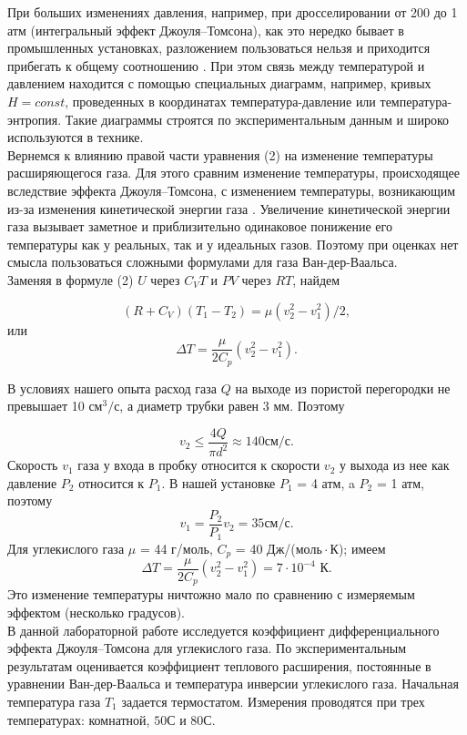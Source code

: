 \documentclass[a4paper, 12pt]{article}%
\begin{document}
	При больших изменениях давления, например, при дросселировании от 200 до 1 атм (интегральный эффект Джоуля–Томсона), как это нередко бывает в промышленных установках, разложением  пользоваться нельзя и приходится прибегать к общему соотношению . При этом связь между температурой и давлением находится с помощью специальных диаграмм, например, кривых $H = const$, проведенных в координатах температура-давление или температура-энтропия. Такие диаграммы строятся по экспериментальным данным и широко используются в технике.\\
	
	Вернемся к влиянию правой части уравнения (2) на изменение температуры расширяющегося газа. Для этого сравним изменение температуры, происходящее вследствие эффекта Джоуля–Томсона, с
	изменением температуры, возникающим из-за изменения кинетической энергии газа . Увеличение кинетической энергии газа вызывает заметное и приблизительно одинаковое понижение его температуры как у реальных, так и у идеальных газов. Поэтому при оценках нет смысла пользоваться сложными формулами для газа Ван-дер-Ваальса.\\
	
	Заменяя в формуле (2) $U$ через $C_V T$ и $P V$ через $RT$, найдем
	
	\begin{equation}
		(R+C_V)(T_1 - T_2) = \mu(v_2^2 - v_1^2)/2,
	\end{equation}
	или
	\begin{equation}
		\Delta T = \dfrac{\mu}{2C_p} (v_2^2 - v_1^2).
	\end{equation}
	
	В условиях нашего опыта расход газа $Q$ на выходе из пористой перегородки не превышает 10 $см^3/с$, а диаметр трубки равен 3 мм. Поэтому
	
	\begin{equation}
		v_2 \leqslant \dfrac{4Q}{\pi d^2} \approx 140 \text{см/с}.
	\end{equation}
	Скорость $v_1$ газа у входа в пробку относится к скорости $v_2$ у выхода из нее как давление $P_2$ относится к $P_1$. В нашей установке $P_1$ = 4 атм, a $P_2$ = 1 атм, поэтому
	\begin{equation}
		v_1 = \dfrac{P_2}{P_1} v_2 = 35 \text{см/с}.
	\end{equation}
	Для углекислого газа $\mu$ = 44 г/моль, $C_p$ = 40 Дж/($моль \cdot К$); имеем
	\begin{equation}
		\Delta T = \dfrac{\mu}{2C_p} (v_2^2 - v_1^2) = 7 \cdot 10^{-4}\text{ К}.
	\end{equation}
	Это изменение температуры ничтожно мало по сравнению с измеряемым эффектом (несколько градусов).\\
	В данной лабораторной работе исследуется коэффициент дифференциального эффекта Джоуля–Томсона для углекислого газа. По экспериментальным результатам оценивается коэффициент теплового расширения, постоянные в уравнении Ван-дер-Ваальса и температура инверсии углекислого газа. Начальная температура газа $T_1$ задается термостатом. Измерения проводятся при трех температурах: комнатной, $50 С$ и $80 С$.\\
	
\end{document}
